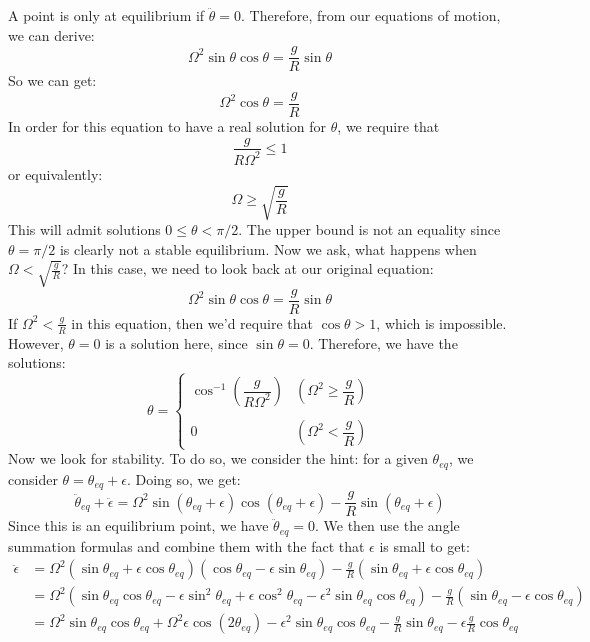 \documentclass[10pt]{article}
\begin{document}
\begin{enumerate}[label=(\alph*)]
        \begin{solution}
            A point is only at equilibrium if $\ddot \theta = 0$. Therefore, from our equations of motion, we can derive:
            \[ \Omega^2 \sin \theta \cos \theta = \frac{g}{R} \sin \theta\] 
            So we can get: 
            \[ \Omega^2 \cos \theta = \frac gR\]
            In order for this equation to have a real solution for $\theta$, we require that 
            \[ \frac{g}{R\Omega^2} \le 1\]
            or equivalently:
            \[ \Omega \ge \sqrt{\frac gR}\]
            This will admit solutions $0 \le \theta < \pi/2$. The upper bound is not an equality since $\theta = \pi/2$ is clearly not a stable equilibrium. Now we ask, what happens when $\Omega < \sqrt{\frac gR}$? In this case, we need to look back at our original equation: 
            \[ \Omega^2 \sin \theta \cos \theta = \frac{g}{R} \sin \theta\]
            If $\Omega^2 < \frac gR$ in this equation, then we'd require that $\cos \theta > 1$, which is impossible. However, $\theta = 0$ is a solution here, since $\sin \theta = 0$. Therefore, we have the solutions: 
            \[ \theta = \begin{cases}
                \cos^{-1}\left(\dfrac{g}{R\Omega^2}\right) & \left(\Omega^2 \ge \dfrac gR\right)\\
                \\
                0 & \left(\Omega^2 < \dfrac gR\right)
            \end{cases}\]
            Now we look for stability. To do so, we consider the hint: for a given $\theta_{eq}$, we consider $\theta = \theta_{eq} + \epsilon$. Doing so, we get: 
            \[ \ddot\theta_{eq} + \ddot \epsilon = \Omega^2 \sin(\theta_{eq} + \epsilon) \cos(\theta_{eq} + \epsilon) - \frac gR \sin(\theta_{eq} + \epsilon)\]
            Since this is an equilibrium point, we have $\ddot \theta_{eq} = 0$. We then use the angle summation formulas and combine them with the fact that $\epsilon$ is small to get: 
            \begin{align*}
                \ddot \epsilon &= \Omega^2(\sin\theta_{eq} + \epsilon \cos\theta_{eq})(\cos\theta_{eq} - \epsilon \sin\theta_{eq}) - \frac gR(\sin \theta_{eq} + \epsilon \cos \theta_{eq})\\
                &= \Omega^2 (\sin \theta_{eq} \cos \theta_{eq} - \epsilon \sin^2 \theta_{eq} + \epsilon \cos^2 \theta_{eq} - \epsilon^2 \sin \theta_{eq} \cos \theta_{eq}) - \frac gR (\sin \theta_{eq} - \epsilon \cos \theta_{eq})\\
                &= \Omega^2 \sin \theta_{eq} \cos \theta_{eq} + \Omega^2 \epsilon \cos(2\theta_{eq}) - \epsilon^2 \sin \theta_{eq} \cos \theta_{eq} - \frac gR \sin \theta_{eq} - \epsilon \frac gR \cos \theta_{eq}

\end{align*}
\end{solution}
\end{enumerate}
\end{document}
